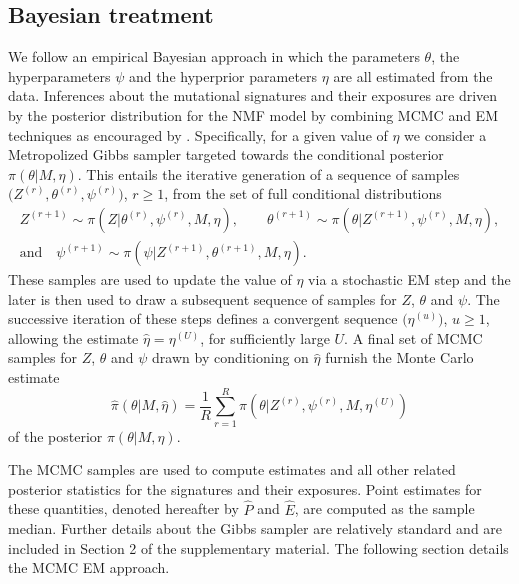 \documentclass{bioinfo}
\begin{document}
\subsection{Bayesian treatment}
We follow an empirical Bayesian approach in which the parameters
$\theta$, the hyperparameters $\psi$ and the hyperprior parameters
$\eta$ are all estimated from the data.  Inferences about the
mutational signatures and their exposures are driven by the posterior
distribution for the NMF model by combining MCMC and EM techniques as
encouraged by \cite{C01}. Specifically, for a given value of $\eta$ we
consider a Metropolized Gibbs sampler targeted towards the conditional
posterior $\pi(\theta|M, \eta)$. This entails the iterative generation
of a sequence of samples $\big(Z^{(r)}, \theta^{(r)},
\psi^{(r)}\big)$, $r \geq 1$, from the set of full conditional
distributions
\begin{gather*}
   Z^{(r+1)} \sim \pi(Z| \theta^{(r)}, \psi^{(r)}, M, \eta), \qquad
   \theta^{(r+1)} \sim \pi(\theta| Z^{(r+1)}, \psi^{(r)}, M, \eta), \\
       \text{and}\quad
   \psi^{(r+1)} \sim \pi(\psi| Z^{(r+1)}, \theta^{(r+1)}, M, \eta).
\end{gather*}
These samples are used to update the value of $\eta$ via a stochastic
EM step and the later is then used to draw a subsequent sequence of
samples for $Z$, $\theta$ and $\psi$. The successive iteration of
these steps defines a convergent sequence $\big(\eta^{(u)}\big)$, $u
\geq 1$, allowing the estimate $\hat\eta = \eta^{(U)}$, for
sufficiently large $U$. A final set of MCMC samples for $Z$, $\theta$
and $\psi$ drawn by conditioning on $\hat\eta$ furnish the 
Monte Carlo estimate
\begin{equation}
 \label{eqn:MCEM_estimate}
   \widehat{\pi}(\theta|M, \hat\eta)
 = 
   \frac{1}{R}\sum_{r=1}^R \pi(\theta|Z^{(r)}, \psi^{(r)}, M,
   \eta^{(U)})
\end{equation}
of the posterior $\pi(\theta|M, \eta)$.


The MCMC samples are used to compute estimates and all other related
posterior statistics for the signatures and their exposures. Point
estimates for these quantities, denoted hereafter by $\widehat P$ and
$\widehat E$, are computed as the sample median. Further details about
the Gibbs sampler are relatively standard and are included in Section
2 of the supplementary material. The following section details the
MCMC EM approach.
\end{document}
